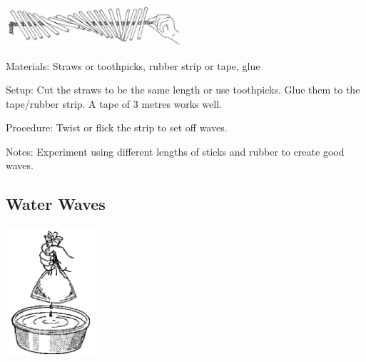 \begin{multicols}{2}
\begin{center}
\includegraphics[width=0.49\textwidth]{./img/vso/flick-sticks.jpg}
\end{center}

\begin{description*}
\item[Materials:]{Straws or toothpicks, rubber strip or tape, glue}
\item[Setup:]{Cut the straws to be the same length or use toothpicks. Glue them to the tape/rubber strip. A tape of 3 metres works well.}
\item[Procedure:]{Twist or flick the strip to set off waves.}
\item[Notes:]{Experiment using different lengths of sticks and rubber to create good waves.}
\end{description*}

\subsection{Water Waves}

\begin{center}
\includegraphics[width=0.25\textwidth]{./img/source/water-waves.png}
\end{center}


\end{multicols}
